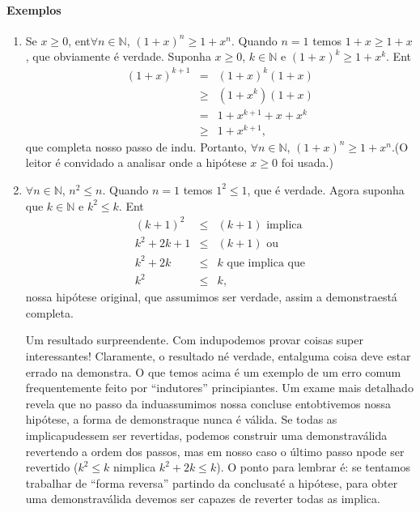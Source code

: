 \paragraph{{\bf Exemplos}}
\begin{enumerate}[{\bf 1.}]
\item Se $x\geq 0$, ent\ao $\forall n\in\mathbb{N}$, $(1+x)^n\geq1+x^n$. Quando $n=1$ temos $1+x\geq 1+x$, que obviamente \'e verdade. Suponha $x\geq 0$, $k\in\mathbb{N}$ e $(1+x)^k\geq1+x^k$. Ent\ao
\begin{eqnarray*}
(1+x)^{k+1}&=& (1+x)^k(1+x)\\
           &\geq& (1+x^k)(1+x)\\
           &=& 1+x^{k+1}+x+x^k\\
           &\geq& 1+x^{k+1},
\end{eqnarray*} 
que completa nosso passo de indu\caoi. Portanto, $\forall n\in\mathbb{N}$, $(1+x)^n\geq1+x^n$.(O leitor \'e convidado a analisar onde a hip\'otese $x\geq 0$ foi usada.)

\item $\forall n\in\mathbb{N}$, $n^2\leq n$. Quando $n=1$ temos $1^2\leq 1$, que \'e verdade. Agora suponha que $k\in\mathbb{N}$ e $k^2\leq k.$ Ent\ao
\begin{eqnarray*}
(k+1)^2&\leq& (k+1) \textrm{ implica}\\
k^2+2k+1&\leq& (k+1) \textrm{ ou}\\
k^2+2k &\leq& k  \textrm{ que implica que}\\
k^2   &\leq& k,
\end{eqnarray*}
nossa hip\'otese original, que assumimos ser verdade, assim a demonstra\cao est\'a completa. 

Um resultado surpreendente. Com indu\cao podemos provar coisas super interessantes! Claramente, o resultado n\ao \'e verdade, ent\ao alguma coisa deve estar errado na demonstra\caoi. O que temos acima \'e um exemplo de um erro comum frequentemente feito por ``indutores'' principiantes. Um exame mais detalhado revela que no passo da indu\cao assumimos nossa conclus\ao e ent\ao obtivemos nossa hip\'otese, a forma de demonstra\cao que nunca \'e v\'alida. Se todas as implica\coes pudessem ser revertidas, podemos construir uma demonstra\cao v\'alida revertendo a ordem dos passos, mas em nosso caso o \'ultimo passo n\ao pode ser revertido ($k^2\leq k$ n\ao implica $k^2+2k\leq k$). O ponto para lembrar \'e: se tentamos trabalhar de ``forma reversa'' partindo da conclus\ao at\'e a hip\'otese, para obter uma demonstra\cao v\'alida devemos ser capazes de reverter todas as implica\cois.


\end{enumerate}
